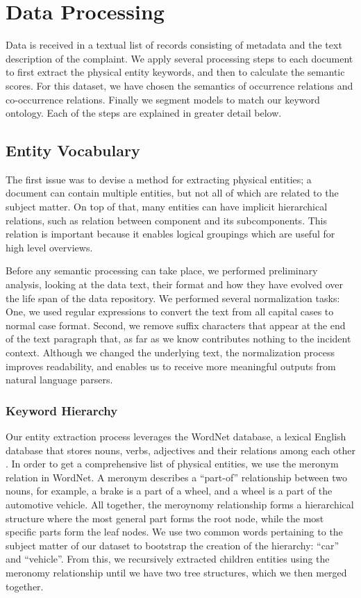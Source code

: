 \chapter{Data Processing}
Data is received in a textual list of records consisting of metadata and the
text description of the complaint. We apply several processing steps to each
document to first extract the physical entity keywords, and then to calculate
the semantic scores. For this dataset, we have chosen the semantics of
occurrence relations and co-occurrence relations. Finally we segment \threed
models to match our keyword ontology. Each of the steps are explained in greater
detail below.


\section{Entity Vocabulary}
The first issue was to devise a method for extracting physical entities; a
document can contain multiple entities, but not all of which are related to the 
subject matter. On top of that, many entities can have implicit hierarchical 
relations, such as relation between component and its subcomponents. This 
relation is important because it enables logical groupings which are useful for
high level overviews.

Before any semantic processing can take place, we performed
preliminary analysis, looking at the data text, their format and how they have
evolved over the life span of the data repository. We performed several
normalization tasks: One, we used regular expressions to convert the text from
all capital cases to normal case format. Second, we remove suffix characters that
appear at the end of the text paragraph that, as far as we know contributes
nothing to the incident context. Although we changed the underlying text, the
normalization process improves readability, and enables us to receive more
meaningful outputs from natural language parsers.

\subsection{Keyword Hierarchy}
Our entity extraction process leverages the WordNet database, a lexical English
database that stores nouns, verbs, adjectives and their relations among each
other \cite{WORDNET}. In order to get a comprehensive list of physical entities, we use the meronym 
relation in WordNet. A meronym describes a ``part-of'' relationship between two 
nouns, for example, a brake is a part of a wheel, and a wheel is a part of the 
automotive vehicle. All together, the meroynomy relationship forms a hierarchical 
structure where the most general part forms the root node, while the most specific 
parts form the leaf nodes. We use two common words pertaining to the subject
matter of our dataset to bootstrap the creation of the hierarchy:
``car'' and ``vehicle''. From this, we recursively extracted children entities
using the meronomy relationship until we have two tree structures, which we then
merged together.

